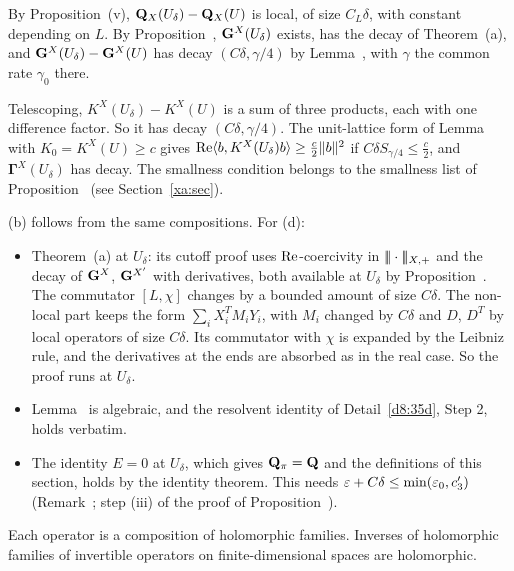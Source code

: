 \begin{detail}\label{d8:35e}
\begin{step}
By Proposition~(v), $\mathbf Q_X(U_\delta)-\mathbf Q_X(U)$ is local, of size $C_L\delta$, with constant depending on $L$. By Proposition~, $\mathbf G^X(U_\delta)$ exists, has the decay of Theorem~(a), and $\mathbf G^X(U_\delta)-\mathbf G^X(U)$ has decay $(C\delta,\gamma/4)$ by Lemma~, with $\gamma$ the common rate $\gamma_0$ there.
\end{step}
\begin{step}
Telescoping, $K^X(U_\delta)-K^X(U)$ is a sum of three products, each with one difference factor. So it has decay $(C\delta,\gamma/4)$. The unit-lattice form of Lemma~ with $K_0=K^X(U)\ge c$ gives $\operatorname{Re}\langle b,K^X(U_\delta)b\rangle\ge\frac c2\|b\|^2$ if $C\delta S_{\gamma/4}\le\frac c2$, and $\boldsymbol\Gamma^X(U_\delta)$ has decay. The smallness condition belongs to the smallness list of Proposition~ (see Section~\ref{xa:sec}).
\end{step}
\begin{step}
(b) follows from the same compositions. For (d):
\begin{itemize}
\item Theorem~(a) at $U_\delta$: its cutoff proof uses $\operatorname{Re}$-coercivity in $|\!|\!|\cdot|\!|\!|_{X,+}$ and the decay of $\mathbf G^X$, $\mathbf G^{X'}$ with derivatives, both available at $U_\delta$ by Proposition~. The commutator $[L,\chi]$ changes by a bounded amount of size $C\delta$. The non-local part keeps the form $\sum_iX_i^TM_iY_i$, with $M_i$ changed by $C\delta$ and $D$, $D^T$ by local operators of size $C\delta$. Its commutator with $\chi$ is expanded by the Leibniz rule, and the derivatives at the ends are absorbed as in the real case. So the proof runs at $U_\delta$.
\item Lemma~ is algebraic, and the resolvent identity of Detail~\ref{d8:35d}, Step 2, holds verbatim.
\item The identity $E=0$ at $U_\delta$, which gives $\mathbf Q_\pi=\mathbf Q$ and the definitions of this section, holds by the identity theorem. This needs $\varepsilon+C\delta\le\min(\varepsilon_0,c'_3)$ (Remark~; step (iii) of the proof of Proposition~).
\end{itemize}
\end{step}
\begin{step}[Analyticity]
Each operator is a composition of holomorphic families. Inverses of holomorphic families of invertible operators on finite-dimensional spaces are holomorphic.
\end{step}
\end{detail}


